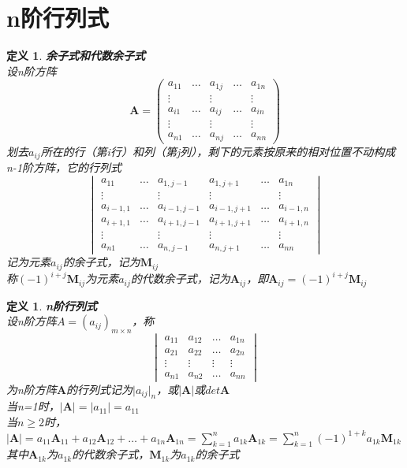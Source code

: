 \documentclass[12pt,oneside]{ctexbook}
\newtheorem{definition}[subsection]{定义}
\begin{document}
\section{n阶行列式}
\begin{definition}
    \textbf{余子式和代数余子式}
    \\设n阶方阵\[\mathbf{A}=
    \begin{pmatrix}
        a_{11}&\dots&a_{1j}&\dots&a_{1n}
        \\ \vdots&&\vdots&&\vdots
        \\ a_{i1}&\dots&a_{ij}&\dots&a_{in}
        \\ \vdots&&\vdots&&\vdots
        \\ a_{n1}&\dots&a_{nj}&\dots&a_{nn}
    \end{pmatrix}\]
    划去\(a_{ij}\)所在的行（第i行）和列（第j列），剩下的元素按原来的相对位置不动构成n-1阶方阵，它的行列式
    \[\begin{vmatrix}
        a_{11}&\dots&a_{1,j-1}&a_{1,j+1}&\dots&a_{1n}
        \\\vdots&&\vdots&\vdots&&\vdots
        \\a_{i-1,1}&\dots&a_{i-1,j-1}&a_{i-1,j+1}&\dots&a_{i-1,n}
        \\a_{i+1,1}&\dots&a_{i+1,j-1}&a_{i+1,j+1}&\dots&a_{i+1,n}
        \\\vdots&&\vdots&\vdots&&\vdots
        \\a_{n1}&\dots&a_{n,j-1}&a_{n,j+1}&\dots&a_{nn}
    \end{vmatrix}\]
    记为元素\(a_{ij}\)的余子式，记为\(\mathbf{M}_{ij}\)
    \\称\((-1)^{i+j}\mathbf{M}_{ij}\)为元素\(a_{ij}\)的代数余子式，记为\(\mathbf{A}_{ij}\)，即\(\mathbf{A}_{ij}=(-1)^{i+j}\mathbf{M}_{ij}\)
\end{definition}
\begin{definition}
    \textbf{n阶行列式}\\
    设n阶方阵\(A=(a_{ij})_{m\times n}\)，称
    \[\begin{vmatrix}
        a_{11}&a_{12}&\dots&a_{1n}
        \\a_{21}&a_{22}&\dots&a_{2n}
        \\ \vdots &\vdots &\vdots &\vdots
        \\a_{n1}&a_{n2}&\dots&a_{nn}
    \end{vmatrix}\]
    为n阶方阵\(\mathbf{A}\)的行列式记为\(\rvert{a_{ij}}\rvert_n\)，或\(\rvert\mathbf{A}\rvert\)或\(det{\mathbf{A}}\)
    \\当n=1时，\(\rvert\mathbf{A}\rvert=\rvert a_{11}\rvert = a_{11}\)
    \\当\(n\geq 2\)时，\(\rvert\mathbf{A}\rvert=a_{11}\mathbf{A}_{11}+a_{12}\mathbf{A}_{12}+\dots+a_{1n}\mathbf{A}_{1n}=\sum\limits_{k=1}^n a_{1k}\mathbf{A}_{1k}=\sum\limits_{k=1}^n (-1)^{1+k}a_{1k}\mathbf{M}_{1k}\)
    \\其中\(\mathbf{A}_{1k}\)为\(a_{1k}\)的代数余子式，\(\mathbf{M}_{1k}\)为\(a_{1k}\)的余子式
\end{definition}
\end{document}
